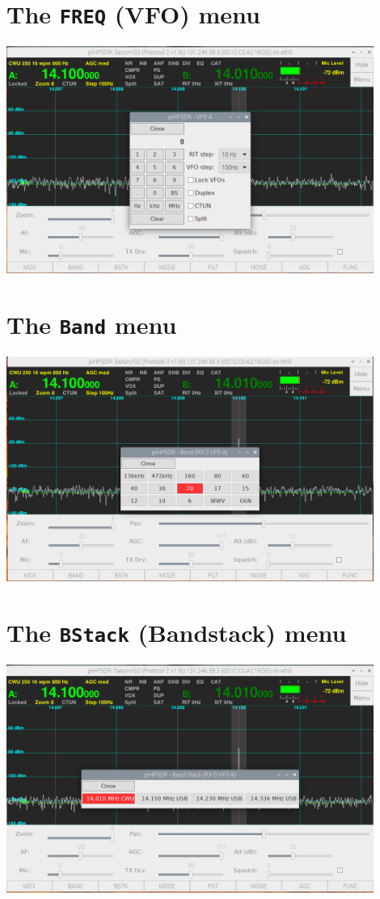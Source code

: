 \documentclass[12pt]{book}
\begin{document}
\section{The \texttt{FREQ} (VFO) menu}
\begin{center}
\includegraphics[width=12cm]{VFOmenu.png}
\end{center}

\section{The \texttt{Band} menu}
\begin{center}
\includegraphics[width=12cm]{BandMenu.png}
\end{center}

\section{The  \texttt{BStack} (Bandstack) menu}
\begin{center}
\includegraphics[width=12cm]{BandstackMenu.png}
\end{center}
 
\end{document}
